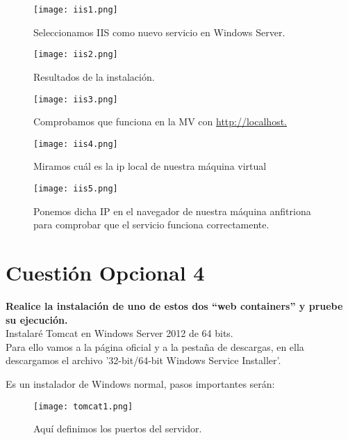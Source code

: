 \documentclass[a4paper, 11pt]{article} %
\begin{document}
\begin{figure}[h]
\centering 
\texttt{[image: iis1.png]} 
\caption{Seleccionamos IIS como nuevo servicio en Windows Server.} 
\vspace{-0.5cm}
\label{contexto:figura} 
\end{figure}


\begin{figure}[h]
\centering 
\texttt{[image: iis2.png]} 
\caption{Resultados de la instalación.} 
\vspace{-0.5cm}
\label{contexto:figura} 
\end{figure}

\begin{figure}[h]
\centering 
\texttt{[image: iis3.png]} 
\caption{Comprobamos que funciona en la MV con \url{http://localhost.}}
\vspace{-0.5cm}
\label{contexto:figura} 
\end{figure}


\begin{figure}[h]
\centering 
\texttt{[image: iis4.png]} 
\caption{Miramos cuál es la ip local de nuestra máquina virtual}
\vspace{-0.5cm}
\label{contexto:figura} 
\end{figure}

\begin{figure}[h]
\centering 
\texttt{[image: iis5.png]} 
\caption{Ponemos dicha IP en el navegador de nuestra máquina anfitriona para comprobar que el servicio funciona correctamente.}
\vspace{-0.5cm}
\label{contexto:figura} 
\end{figure}

\pagebreak

\section{Cuestión Opcional 4}
\textbf{Realice la instalación de uno de estos dos “web containers” y pruebe su ejecución.}\\
Instalaré Tomcat en Windows Server 2012 de 64 bits.\\
Para ello vamos a la página oficial y a la pestaña de descargas, en ella descargamos el archivo '32-bit/64-bit Windows Service Installer'.

Es un instalador de Windows normal, pasos importantes serán:

\begin{figure}[h]
\centering 
\texttt{[image: tomcat1.png]} 
\caption{Aquí definimos los puertos del servidor.} 
\vspace{-0.5cm}
\label{contexto:figura} 
\end{figure}
\end{document}
